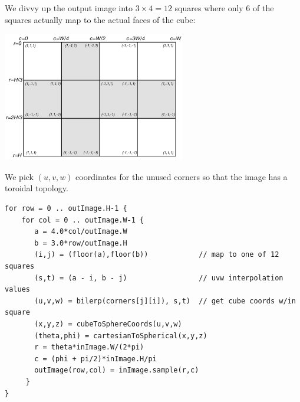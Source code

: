 \documentclass[11pt, oneside]{article}   	%
\begin{document}
\pagebreak

We divvy up the output image into $3 \times 4 = 12$ squares where only 6 of the
squares actually map to the actual faces of the cube:
\begin{center}
\includegraphics[width=0.6\textwidth]{cube-coords} 
\end{center}      
We pick $(u,v,w)$ coordinates for the unused corners so that the image has a toroidal topology.

\begin{verbatim}
for row = 0 .. outImage.H-1 {
    for col = 0 .. outImage.W-1 {
       a = 4.0*col/outImage.W
       b = 3.0*row/outImage.H
       (i,j) = (floor(a),floor(b))            // map to one of 12 squares
       (s,t) = (a - i, b - j)                 // uvw interpolation values
       (u,v,w) = bilerp(corners[j][i]), s,t)  // get cube coords w/in square
       (x,y,z) = cubeToSphereCoords(u,v,w)   
       (theta,phi) = cartesianToSpherical(x,y,z)
       r = theta*inImage.W/(2*pi)
       c = (phi + pi/2)*inImage.H/pi
       outImage(row,col) = inImage.sample(r,c)
     }
}
\end{verbatim}
\end{document}
